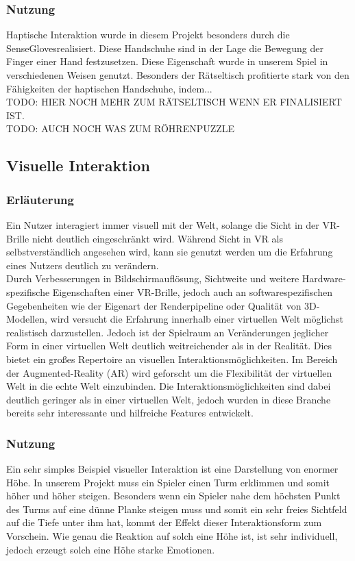 \subsubsection{Nutzung}
Haptische Interaktion wurde in diesem Projekt besonders durch die \dq SenseGloves\dq realisiert. Diese Handschuhe sind in der Lage die Bewegung der Finger einer Hand festzusetzen. Diese Eigenschaft wurde in unserem Spiel in verschiedenen Weisen genutzt. Besonders der Rätseltisch profitierte stark von den Fähigkeiten der haptischen Handschuhe, indem...\\

TODO: HIER NOCH MEHR ZUM RÄTSELTISCH WENN ER FINALISIERT IST.\\

TODO: AUCH NOCH WAS ZUM RÖHRENPUZZLE


\subsection{Visuelle Interaktion}

\subsubsection{Erläuterung}
Ein Nutzer interagiert immer visuell mit der Welt, solange die Sicht in der VR-Brille nicht deutlich eingeschränkt wird. Während Sicht in VR als selbstverständlich angesehen wird, kann sie genutzt werden um die Erfahrung eines Nutzers deutlich zu verändern.\\

Durch Verbesserungen in Bildschirmauflösung, Sichtweite und weitere Hardware-spezifische Eigenschaften einer VR-Brille, jedoch auch an softwarespezifischen Gegebenheiten wie der Eigenart der Renderpipeline oder Qualität von 3D-Modellen, wird versucht die Erfahrung innerhalb einer virtuellen Welt möglichst realistisch darzustellen. Jedoch ist der Spielraum an Veränderungen jeglicher Form in einer virtuellen Welt deutlich weitreichender als in der Realität. Dies bietet ein großes Repertoire an visuellen Interaktionsmöglichkeiten. Im Bereich der Augmented-Reality (AR) wird geforscht um die Flexibilität der virtuellen Welt in die echte Welt einzubinden. Die Interaktionsmöglichkeiten sind dabei deutlich geringer als in einer virtuellen Welt, jedoch wurden in diese Branche bereits sehr interessante und hilfreiche Features entwickelt.

\subsubsection{Nutzung}
Ein sehr simples Beispiel visueller Interaktion ist eine Darstellung von enormer Höhe. In unserem Projekt muss ein Spieler einen Turm erklimmen und somit höher und höher steigen. Besonders wenn ein Spieler nahe dem höchsten Punkt des Turms auf eine dünne Planke steigen muss und somit ein sehr freies Sichtfeld auf die Tiefe unter ihm hat, kommt der Effekt dieser Interaktionsform zum Vorschein. Wie genau die Reaktion auf solch eine Höhe ist, ist sehr individuell, jedoch erzeugt solch eine Höhe starke Emotionen.\\

